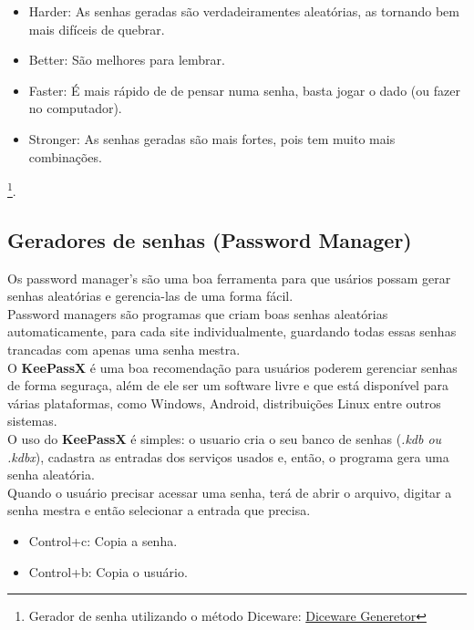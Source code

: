 \documentclass[12pt, letterpaper]{report}
\begin{document}
\begin{itemize}
	\item Harder: As senhas geradas são verdadeiramentes aleatórias, as tornando bem mais difíceis de quebrar.
	\item Better: São melhores para lembrar.
	\item Faster: É mais rápido de de pensar numa senha, basta jogar o dado (ou fazer no computador).
	\item Stronger: As senhas geradas são mais fortes, pois tem muito mais combinações.
\end{itemize}

	\footnote{Gerador de senha utilizando o método Diceware: \href{https://github.com/caioau/personal/blob/master/DicewareGen/dicewareGen.py}{Diceware Generetor}}.

\subsection{Geradores de senhas (Password Manager)}

	Os password manager's são uma boa ferramenta para que usários possam gerar senhas aleatórias e gerencia-las de uma forma fácil.\\

	Password managers são programas que criam boas senhas aleatórias automaticamente, para cada site individualmente, guardando todas essas senhas trancadas com apenas uma senha mestra.\\

	O \textbf{KeePassX} é uma boa recomendação para usuários poderem gerenciar senhas de forma seguraça, além de ele ser um software livre e que está disponível para várias plataformas, como Windows, Android, distribuições Linux entre outros sistemas.\\

	O uso do \textbf{KeePassX} é simples: o usuario cria o seu banco de senhas (\textit{.kdb ou .kdbx}), cadastra as entradas dos serviços usados e, então, o programa gera uma senha aleatória.\\
	Quando o usuário precisar acessar uma senha, terá de abrir o arquivo, digitar a senha mestra e então selecionar a entrada que precisa.\\

\begin{itemize}
	\item Control+c: Copia a senha.
	\item Control+b: Copia o usuário.
\end{itemize}
\end{document}
